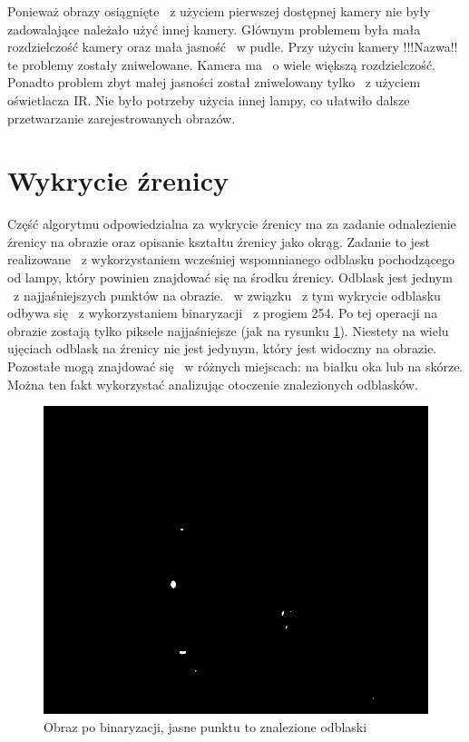 Ponieważ obrazy osiągnięte ~z użyciem pierwszej dostępnej kamery nie były zadowalające należało użyć innej kamery. Głównym problemem była mała rozdzielczość kamery oraz mała jasność ~w pudle. Przy użyciu kamery !!!Nazwa!! te problemy zostały zniwelowane. Kamera ma ~o wiele większą rozdzielczość. Ponadto problem zbyt małej jasności został zniwelowany tylko ~z użyciem oświetlacza IR. Nie było potrzeby użycia innej lampy, co ułatwiło dalsze przetwarzanie zarejestrowanych obrazów.


\section{Wykrycie źrenicy}
\label{sec:wykrycieZrenicy}
Część algorytmu odpowiedzialna za wykrycie źrenicy ma za zadanie odnalezienie źrenicy na obrazie oraz opisanie kształtu źrenicy jako okrąg. Zadanie to jest realizowane ~z wykorzystaniem wcześniej wspomnianego odblasku pochodzącego od lampy, który powinien znajdować się na środku źrenicy. Odblask jest jednym ~z najjaśniejszych punktów na obrazie. ~w związku ~z tym wykrycie odblasku odbywa się ~z wykorzystaniem binaryzacji ~z progiem 254. Po tej operacji na obrazie zostają tylko piksele najjaśniejsze (jak na rysunku \ref{fig:binaryzacja}). Niestety na wielu ujęciach odblask na źrenicy nie jest jedynym, który jest widoczny na obrazie. Pozostałe mogą znajdować się ~w różnych miejscach: na białku oka lub na skórze. Można ten fakt wykorzystać analizując otoczenie znalezionych odblasków. 
\begin{figure}
\begin{center}
\includegraphics[scale=0.5]{binaryzacja.jpg}
\caption{Obraz po binaryzacji, jasne punktu to znalezione odblaski}
\label{fig:binaryzacja}
\end{center}
\end{figure}

